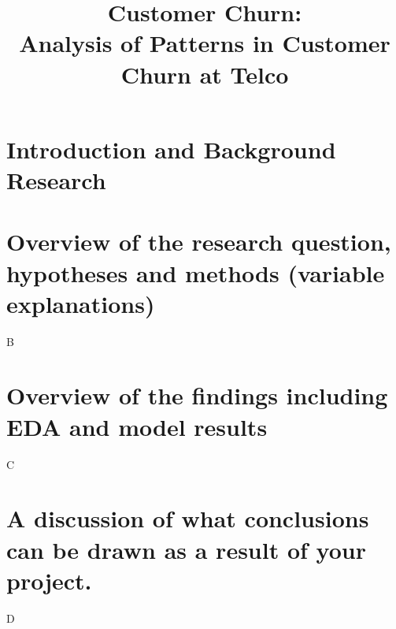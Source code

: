 \documentclass[a4paper,man,english]{apa}
\title{Customer Churn:\\Analysis of Patterns in Customer Churn at Telco}
\begin{document}
  \maketitle

  \section{Introduction and Background Research}
  
  \section{Overview of the research question, hypotheses and methods (variable
explanations)}
  B
  \section{Overview of the findings including EDA and model results}
  C
  \section{A discussion of what conclusions can be drawn as a result of your project.}
  D
\end{document}
